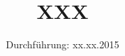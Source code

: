 

\subject{Versuchsprotokoll zum Versuch Nr. XXX}
\title{XXX}
\date{
  Durchführung: xx.xx.2015
}



\maketitle
\thispagestyle{empty}
\newpage






\printbibliography


